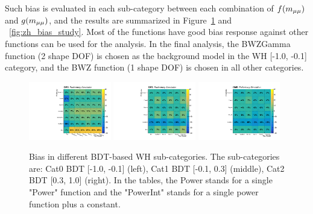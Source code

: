 Such bias is evaluated in each sub-category between each combination of $f(m_{\mu\mu})$ and $g(m_{\mu\mu})$, 
and the results are summarized in Figure~\ref{fig:wh_bias_study} and ~\ref{fig:zh_bias_study}.
Most of the functions have good bias response against other functions can be used for the analysis.
In the final analysis, the BWZGamma function (2 shape DOF) is chosen as the background model in the WH [-1.0, -0.1] category,
and the BWZ function (1 shape DOF) is chosen in all other categories. 


\begin{figure}[!htb]
  \centering
  \captionsetup{justification=justified}
  \includegraphics[width=0.32\textwidth]{pics/VH_sec/Bias_study/pulls_WH_BDT_n10_n01_signal_strength_1_table.pdf}
  \includegraphics[width=0.32\textwidth]{pics/VH_sec/Bias_study/pulls_WH_BDT_n01_p03_signal_strength_1_table.pdf}
  \includegraphics[width=0.32\textwidth]{pics/VH_sec/Bias_study/pulls_WH_BDT_p03_p10_signal_strength_1_table.pdf}
  \caption{Bias in different BDT-based WH sub-categories. The sub-categories are: Cat0 BDT [-1.0, -0.1] (left), Cat1 BDT [-0.1, 0.3] (middle), Cat2 BDT [0.3, 1.0] (right). In the tables, the Power stands for a single "Power" function and the "PowerInt" stands for a single power function plus a constant.}
  \label{fig:wh_bias_study}
\end{figure}

